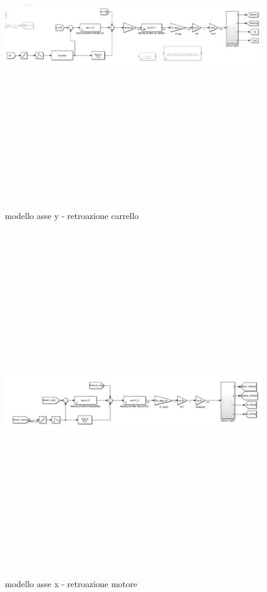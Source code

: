 \documentclass{article}
\begin{document}
\begin{figure}[H]
\centering
\includegraphics[width=12cm,height=15cm,keepaspectratio]{./strategia_sim/PIcarry.png}
\caption{ modello asse y - retroazione carrello}
\end{figure}

\begin{figure}[H]
\centering
\includegraphics[width=12cm,height=15cm,keepaspectratio]{./strategia_sim/PImotx.png} 
\caption{modello asse x - retroazione motore}
\end{figure}
\end{document}

